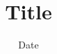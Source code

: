 \documentclass[12pt]{umons/memoire-umons}
\date{Date}
\title{Title}
\begin{document}
\kant
\end{document}
